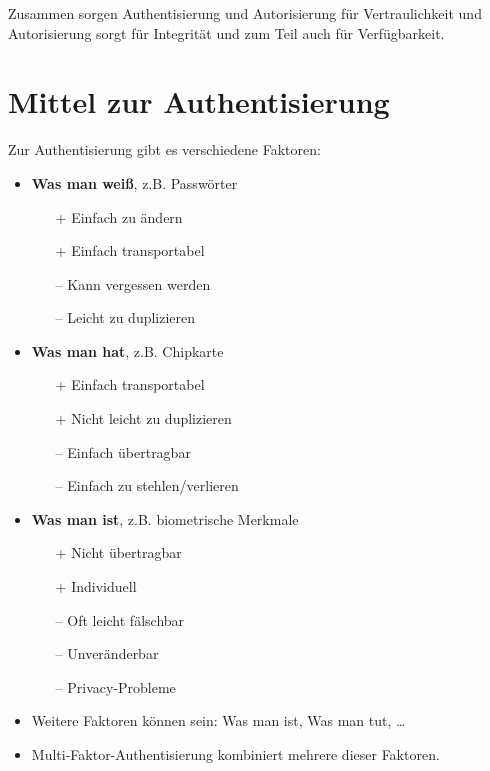     Zusammen sorgen Authentisierung und Autorisierung für Vertraulichkeit und Autorisierung sorgt für Integrität und zum Teil auch für Verfügbarkeit.

    \section{Mittel zur Authentisierung}
        Zur Authentisierung gibt es verschiedene Faktoren:
        \begin{itemize}
        	\item \textbf{Was man weiß}, z.B. Passwörter
            	\begin{itemize}
            		\item[+] Einfach zu ändern
            		\item[+] Einfach transportabel
            		\item[--] Kann vergessen werden
            		\item[--] Leicht zu duplizieren
            	\end{itemize}
        	\item \textbf{Was man hat}, z.B. Chipkarte
            	\begin{itemize}
            		\item[+] Einfach transportabel
            		\item[+] Nicht leicht zu duplizieren
            		\item[--] Einfach übertragbar
            		\item[--] Einfach zu stehlen/verlieren
            	\end{itemize}
        	\item \textbf{Was man ist}, z.B. biometrische Merkmale
            	\begin{itemize}
            		\item[+] Nicht übertragbar
            		\item[+] Individuell
            		\item[--] Oft leicht fälschbar
            		\item[--] Unveränderbar
            		\item[--] Privacy-Probleme
            	\end{itemize}
        	\item Weitere Faktoren können sein: Was man ist, Was man tut, \dots
        	\item Multi-Faktor-Authentisierung kombiniert mehrere dieser Faktoren.
        \end{itemize}

